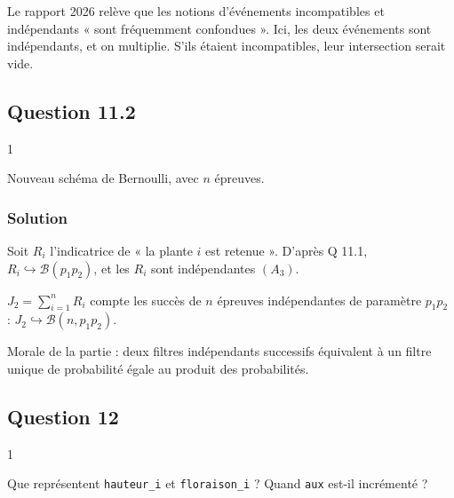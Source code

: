 \documentclass[11pt,a4paper]{article}
\newcommand{\equationajustee}[1]{%
  \sbox{\boiteequation}{$\displaystyle #1$}%
  \ifdim\wd\boiteequation>\linewidth
    \[\resizebox{\linewidth}{!}{\usebox{\boiteequation}}\]%
  \else
    \[#1\]%
  \fi}
\begin{document}
\equationajustee{\boxed{P(\text{plante retenue})=p_1p_2}}

\begin{piege}

Le rapport 2026 relève que les notions d'événements incompatibles et indépendants « sont fréquemment confondues ». Ici, les deux événements sont indépendants, et on multiplie. S'ils étaient incompatibles, leur intersection serait vide.

\end{piege}

\hypertarget{question-11.2}{%
\subsection{Question 11.2}\label{question-11.2}}

\begin{indication}{1}

Nouveau schéma de Bernoulli, avec \(n\) épreuves.

\end{indication}

\hypertarget{solution-24}{%
\subsubsection{Solution}\label{solution-24}}

Soit \(R_i\) l'indicatrice de « la plante \(i\) est retenue ». D'après Q 11.1, \(R_i\hookrightarrow\mathcal B(p_1p_2)\), et les \(R_i\) sont indépendantes \((A_3)\).

\(J_2=\sum_{i=1}^nR_i\) compte les succès de \(n\) épreuves indépendantes de paramètre \(p_1p_2\) : \textbf{\(J_2\hookrightarrow\mathcal B(n,p_1p_2)\)}.

\begin{methode}

Morale de la partie : deux filtres indépendants successifs équivalent à un filtre unique de probabilité égale au produit des probabilités.

\end{methode}

\hypertarget{question-12}{%
\subsection{Question 12}\label{question-12}}

\begin{indication}{1}

Que représentent \texttt{hauteur\_i} et \texttt{floraison\_i} ? Quand \texttt{aux} est-il incrémenté ?

\end{indication}
\end{document}
